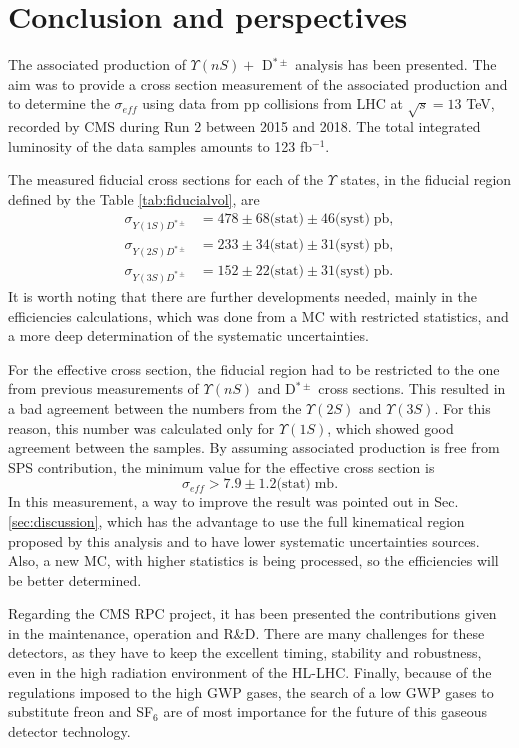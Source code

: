 \chapter{Conclusion and perspectives}\label{chap:conclusion}

The associated production of $\Upsilon(nS) + $ D$^{*\pm}$ analysis has been presented. The aim was to provide a cross section measurement of the associated production and to determine the $\sigma_{eff}$ using data from pp collisions from LHC at $\sqrt{s} = 13$ TeV, recorded by CMS during Run 2 between 2015 and 2018. The total integrated luminosity of the data samples amounts to 123 fb$^{-1}$.

The measured fiducial cross sections for each of the $\Upsilon$ states, in the fiducial region defined by the Table \ref{tab:fiducialvol}, are
\begin{equation}
  \begin{split}
    \sigma_{Y(1S)D^{*\pm}} &= 478 \pm 68 \text{(stat)} \pm 46 \text{(syst)} \; \text{pb},\\
    \sigma_{Y(2S)D^{*\pm}} &= 233 \pm 34 \text{(stat)} \pm 31 \text{(syst)} \; \text{pb},\\
    \sigma_{Y(3S)D^{*\pm}} &= 152 \pm 22 \text{(stat)} \pm 31 \text{(syst)} \; \text{pb}.
  \end{split}
\end{equation}
It is worth noting that there are further developments needed, mainly in the efficiencies calculations, which was done from a MC with restricted statistics, and a more deep determination of the systematic uncertainties.

For the effective cross section, the fiducial region had to be restricted to the one from previous measurements of $\Upsilon(nS)$ and D$^{*\pm}$ cross sections. This resulted in a bad agreement between the numbers from the $\Upsilon(2S)$ and $\Upsilon(3S)$. For this reason, this number was calculated only for $\Upsilon(1S)$, which showed good agreement between the samples. By assuming associated production is free from SPS contribution, the minimum value for the effective cross section is
\begin{equation}
  \sigma_{eff} > 7.9 \pm 1.2 \text{(stat)} \; \text{mb}.
\end{equation}
In this measurement, a way to improve the result was pointed out in Sec. \ref{sec:discussion}, which has the advantage to use the full kinematical region proposed by this analysis and to have lower systematic uncertainties sources. Also, a new MC, with higher statistics is being processed, so the efficiencies will be better determined.

Regarding the CMS RPC project, it has been presented the contributions given in the maintenance, operation and R\&D. There are many challenges for these detectors, as they have to keep the excellent timing, stability and robustness, even in the high radiation environment of the HL-LHC. Finally, because of the regulations imposed to the high GWP gases, the search of a low GWP gases to substitute freon and SF$_6$ are of most importance for the future of this gaseous detector technology.